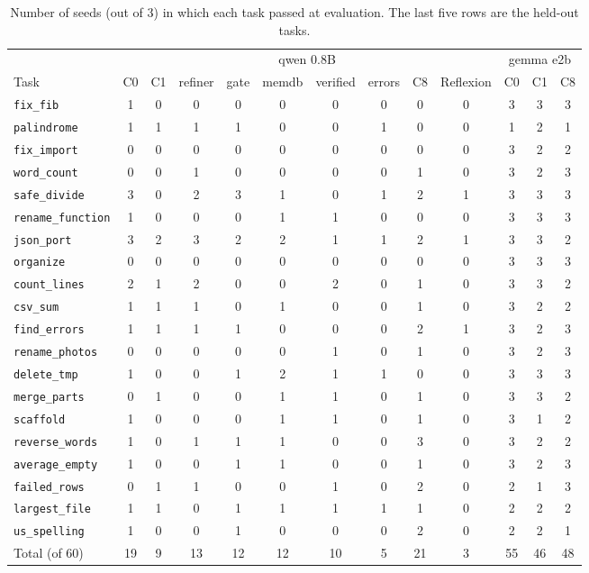 \begin{table}[H]
\centering
\scriptsize
\setlength{\tabcolsep}{3.5pt}
\begin{tabular}{l|ccccccccc|ccc}
\toprule
 & \multicolumn{9}{c|}{qwen 0.8B} & \multicolumn{3}{c}{gemma e2b} \\
Task & C0 & C1 & refiner & gate & memdb & verified & errors & C8 & Reflexion & C0 & C1 & C8 \\
\midrule
\texttt{fix\_fib}         & 1 & 0 & 0 & 0 & 0 & 0 & 0 & 0 & 0 & 3 & 3 & 3 \\
\texttt{palindrome}       & 1 & 1 & 1 & 1 & 0 & 0 & 1 & 0 & 0 & 1 & 2 & 1 \\
\texttt{fix\_import}      & 0 & 0 & 0 & 0 & 0 & 0 & 0 & 0 & 0 & 3 & 2 & 2 \\
\texttt{word\_count}      & 0 & 0 & 1 & 0 & 0 & 0 & 0 & 1 & 0 & 3 & 2 & 3 \\
\texttt{safe\_divide}     & 3 & 0 & 2 & 3 & 1 & 0 & 1 & 2 & 1 & 3 & 3 & 3 \\
\texttt{rename\_function} & 1 & 0 & 0 & 0 & 1 & 1 & 0 & 0 & 0 & 3 & 3 & 3 \\
\texttt{json\_port}       & 3 & 2 & 3 & 2 & 2 & 1 & 1 & 2 & 1 & 3 & 3 & 2 \\
\texttt{organize}         & 0 & 0 & 0 & 0 & 0 & 0 & 0 & 0 & 0 & 3 & 3 & 3 \\
\texttt{count\_lines}     & 2 & 1 & 2 & 0 & 0 & 2 & 0 & 1 & 0 & 3 & 3 & 2 \\
\texttt{csv\_sum}         & 1 & 1 & 1 & 0 & 1 & 0 & 0 & 1 & 0 & 3 & 2 & 2 \\
\texttt{find\_errors}     & 1 & 1 & 1 & 1 & 0 & 0 & 0 & 2 & 1 & 3 & 2 & 3 \\
\texttt{rename\_photos}   & 0 & 0 & 0 & 0 & 0 & 1 & 0 & 1 & 0 & 3 & 2 & 3 \\
\texttt{delete\_tmp}      & 1 & 0 & 0 & 1 & 2 & 1 & 1 & 0 & 0 & 3 & 3 & 3 \\
\texttt{merge\_parts}     & 0 & 1 & 0 & 0 & 1 & 1 & 0 & 1 & 0 & 3 & 3 & 2 \\
\texttt{scaffold}         & 1 & 0 & 0 & 0 & 1 & 1 & 0 & 1 & 0 & 3 & 1 & 2 \\
\midrule
\texttt{reverse\_words}   & 1 & 0 & 1 & 1 & 1 & 0 & 0 & 3 & 0 & 3 & 2 & 2 \\
\texttt{average\_empty}   & 1 & 0 & 0 & 1 & 1 & 0 & 0 & 1 & 0 & 3 & 2 & 3 \\
\texttt{failed\_rows}     & 0 & 1 & 1 & 0 & 0 & 1 & 0 & 2 & 0 & 2 & 1 & 3 \\
\texttt{largest\_file}    & 1 & 1 & 0 & 1 & 1 & 1 & 1 & 1 & 0 & 2 & 2 & 2 \\
\texttt{us\_spelling}     & 1 & 0 & 0 & 1 & 0 & 0 & 0 & 2 & 0 & 2 & 2 & 1 \\
\midrule
Total (of 60)             & 19 & 9 & 13 & 12 & 12 & 10 & 5 & 21 & 3 & 55 & 46 & 48 \\
\bottomrule
\end{tabular}
\caption{Number of seeds (out of 3) in which each task passed at evaluation. The last five rows are
the held-out tasks.}
\label{tab:pertask}
\end{table}

